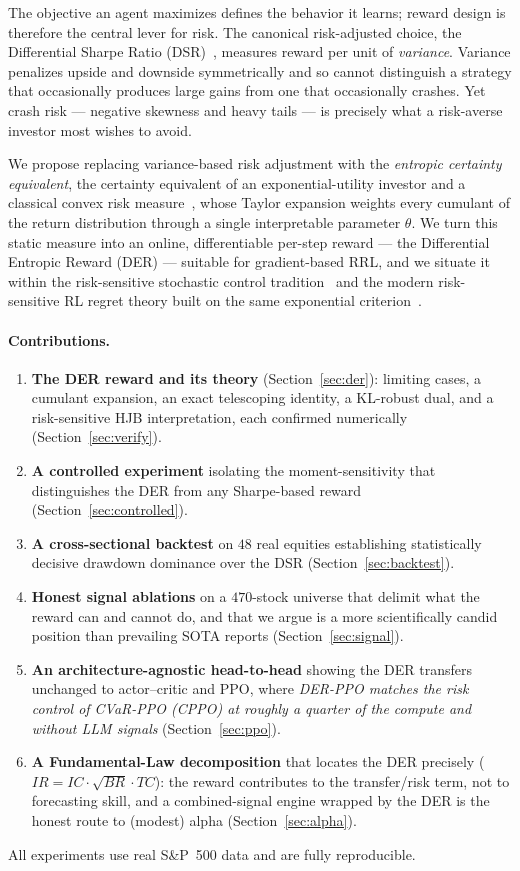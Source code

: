 \documentclass[11pt]{article}
\theoremstyle{definition}
\begin{document}
The objective an agent maximizes defines the behavior it learns; reward design is
therefore the central lever for risk. The canonical risk-adjusted choice, the
Differential Sharpe Ratio (DSR)~\cite{moody2001}, measures reward per unit of
\emph{variance}. Variance penalizes upside and downside symmetrically and so cannot
distinguish a strategy that occasionally produces large gains from one that
occasionally crashes. Yet crash risk --- negative skewness and heavy tails --- is
precisely what a risk-averse investor most wishes to avoid.

We propose replacing variance-based risk adjustment with the \emph{entropic certainty
equivalent}, the certainty equivalent of an exponential-utility investor and a
classical convex risk measure~\cite{follmer2002}, whose Taylor expansion weights every
cumulant of the return distribution through a single interpretable parameter $\theta$.
We turn this static measure into an online, differentiable per-step reward --- the
Differential Entropic Reward (DER) --- suitable for gradient-based RRL, and we situate
it within the risk-sensitive stochastic control tradition~\cite{bielecki1999,
flemingmce1995} and the modern risk-sensitive RL regret theory built on the same
exponential criterion~\cite{fei2020,fei2021,noorani2022}.

\paragraph{Contributions.}
\begin{enumerate}
\item \textbf{The DER reward and its theory} (Section~\ref{sec:der}): limiting cases,
a cumulant expansion, an exact telescoping identity, a KL-robust dual, and a
risk-sensitive HJB interpretation, each confirmed numerically
(Section~\ref{sec:verify}).
\item \textbf{A controlled experiment} isolating the moment-sensitivity that
distinguishes the DER from any Sharpe-based reward (Section~\ref{sec:controlled}).
\item \textbf{A cross-sectional backtest} on $48$ real equities establishing
statistically decisive drawdown dominance over the DSR (Section~\ref{sec:backtest}).
\item \textbf{Honest signal ablations} on a $470$-stock universe that delimit what the
reward can and cannot do, and that we argue is a more scientifically candid position
than prevailing SOTA reports (Section~\ref{sec:signal}).
\item \textbf{An architecture-agnostic head-to-head} showing the DER transfers
unchanged to actor--critic and PPO, where \emph{DER-PPO matches the risk control of
CVaR-PPO (CPPO) at roughly a quarter of the compute and without LLM signals}
(Section~\ref{sec:ppo}).
\item \textbf{A Fundamental-Law decomposition} that locates the DER precisely
($IR=IC\cdot\sqrt{BR}\cdot TC$): the reward contributes to the transfer/risk term, not
to forecasting skill, and a combined-signal engine wrapped by the DER is the honest
route to (modest) alpha (Section~\ref{sec:alpha}).
\end{enumerate}
All experiments use real S\&P~500 data and are fully reproducible.
\end{document}
